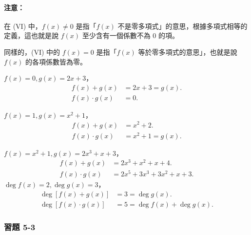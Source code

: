 \paragraph{注意：}
在 (VI) 中，$f(x) \neq 0$ 是指「$f(x)$ 不是零多項式」的意思，根據多項式相等的定義，這也就是說 $f(x)$ 至少含有一個係數不為 $0$ 的項。

同樣的，(VI) 中的 $f(x)=0$ 是指「$f(x)$ 等於零多項式的意思」，也就是說 $f(x)$ 的各項係數皆為零。

\begin{example}\label{ex:5-2-5}
$f(x)=0, g(x)=2x+3$，
\begin{align*}
  f(x)+g(x) &= 2x+3 = g(x). \\
  f(x) \cdot g(x) &= 0.
\end{align*}
\end{example}

\begin{example}\label{ex:5-2-6}
$f(x)=1, g(x)=x^2+1$，
\begin{align*}
  f(x)+g(x) &= x^2+2. \\
  f(x) \cdot g(x) &= x^2+1 = g(x).
\end{align*}
\end{example}

\begin{example}\label{ex:5-2-7}
$f(x)=x^2+1, g(x)=2x^3+x+3$，
\begin{align*}
  f(x)+g(x) &= 2x^3+x^2+x+4. \\
  f(x) \cdot g(x) &= 2x^5+3x^3+3x^2+x+3.
\end{align*}
$\deg f(x)=2, \deg g(x)=3$，
\begin{align*}
  \deg[f(x)+g(x)] &= 3 = \deg g(x). \\
  \deg[f(x) \cdot g(x)] &= 5 = \deg f(x) + \deg g(x).
\end{align*}
\end{example}

\subsubsection*{習題 5-3}\label{sec:ex5-3}

